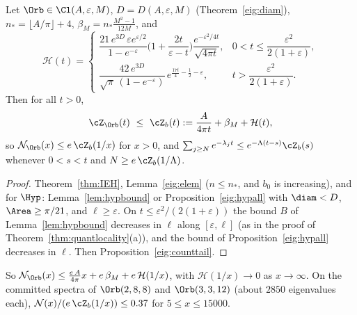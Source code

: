 \begin{theorem}\label{eig:count}
Let $\Orb\in\Cl(A,\varepsilon,M)$, $D=D(A,\varepsilon,M)$ (Theorem~\ref{eig:diam}), $n_*=\lfloor A/\pi\rfloor+4$, $\beta_M=n_*\frac{M^2-1}{12M}$, and
\[
  \mathcal H(t)=\begin{cases}\dfrac{21\,e^{3D}\,\varepsilon e^{\varepsilon/2}}{1-e^{-\varepsilon}}\Big(1+\dfrac{2t}{\varepsilon-t}\Big)\dfrac{e^{-\varepsilon^2/4t}}{\sqrt{4\pi t}}, & 0<t\le\dfrac{\varepsilon^2}{2(1+\varepsilon)},\\[3mm]
  \dfrac{42\,e^{3D}}{\sqrt\pi\,(1-e^{-\varepsilon})}\,e^{\frac{17t}4-\frac12-\varepsilon}, & t>\dfrac{\varepsilon^2}{2(1+\varepsilon)}.\end{cases}
\]
Then for all $t>0$,
\[
  \cZ_\Orb(t)\ \le\ \cZ_b(t):=\frac A{4\pi t}+\beta_M+\mathcal H(t),
\]
so $\mathcal N_\Orb(x)\le e\,\cZ_b(1/x)$ for $x>0$, and $\sum_{j\ge N}e^{-\lambda_jt}\le e^{-\Lambda(t-s)}\cZ_b(s)$ whenever $0<s<t$ and $N\ge e\,\cZ_b(1/\Lambda)$.
\end{theorem}

\begin{proof}
Theorem~\ref{thm:IEH}, Lemma~\ref{eig:elem} ($n\le n_*$, and $b_0$ is increasing), and for $\Hyp$: Lemma~\ref{lem:hypbound} or Proposition~\ref{eig:hypall} with $\diam<D$, $\Area\ge\pi/21$, and $\ell\ge\varepsilon$. On $t\le\varepsilon^2/(2(1+\varepsilon))$ the bound $B$ of Lemma~\ref{lem:hypbound} decreases in $\ell$ along $[\varepsilon,\ell]$ (as in the proof of Theorem~\ref{thm:quantlocality}(a)), and the bound of Proposition~\ref{eig:hypall} decreases in $\ell$. Then Proposition~\ref{eig:counttail}.
\end{proof}

So $\mathcal N_\Orb(x)\le\frac{e\,A}{4\pi}x+e\,\beta_M+e\,\mathcal H(1/x)$, with $\mathcal H(1/x)\to0$ as $x\to\infty$. On the committed spectra of $\Orb(2,8,8)$ and $\Orb(3,3,12)$ (about $2850$ eigenvalues each), $\mathcal N(x)/(e\,\cZ_b(1/x))\le0.37$ for $5\le x\le15000$.
